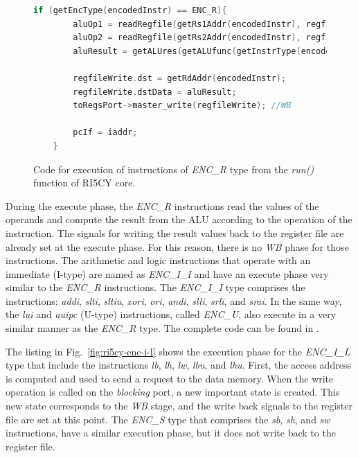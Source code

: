 \begin{figure}[htb!]
    \begin{lstlisting}[language=c++]
    if (getEncType(encodedInstr) == ENC_R){
        aluOp1 = readRegfile(getRs1Addr(encodedInstr), regfile);
        aluOp2 = readRegfile(getRs2Addr(encodedInstr), regfile);
        aluResult = getALUres(getALUfunc(getInstrType(encodedInstr)), aluOp1, aluOp2);
        
        regfileWrite.dst = getRdAddr(encodedInstr);
        regfileWrite.dstData = aluResult;
        toRegsPort->master_write(regfileWrite); //WB
        
        pcIf = iaddr;
    }\end{lstlisting}
    \caption{Code for execution of instructions of \textit{ENC\_R} type from the \textit{run()} function of RI5CY core.}
    \label{fig:ri5cy-enc-r}
\end{figure}

During the execute phase, the \textit{ENC\_R} instructions read the values of the operands and compute the result from the ALU according to the operation of the instruction. The signals for writing the result values back to the register file are already set at the execute phase. For this reason, there is no \textit{WB} phase for those instructions. The arithmetic and logic instructions that operate with an immediate (I-type) are named as \textit{ENC\_I\_I} and have an execute phase very similar to the \textit{ENC\_R} instructions. The \textit{ENC\_I\_I} type comprises the instructions: \textit{addi}, \textit{slti}, \textit{sltiu}, \textit{xori}, \textit{ori}, \textit{andi}, \textit{slli}, \textit{srli}, and \textit{srai}. In the same way, the \textit{lui} and \textit{auipc} (U-type) instructions, called \textit{ENC\_U}, also execute in a very similar manner as the \textit{ENC\_R} type. The complete code can be found in \cite{descam}.

The listing in Fig.~\ref{fig:ri5cy-enc-i-l} shows the execution phase for the \textit{ENC\_I\_L} type that include the instructions \textit{lb}, \textit{lh}, \textit{lw}, \textit{lbu}, and \textit{lhu}. First, the access address is computed and used to send a request to the data memory. When the write operation is called on the \textit{blocking} port, a new important state is created. This new state corresponds to the \textit{WB} stage, and the write back signals to the register file are set at this point. The \textit{ENC\_S} type that comprises the \textit{sb}, \textit{sh}, and \textit{sw} instructions, have a similar execution phase, but it does not write back to the register file. 

